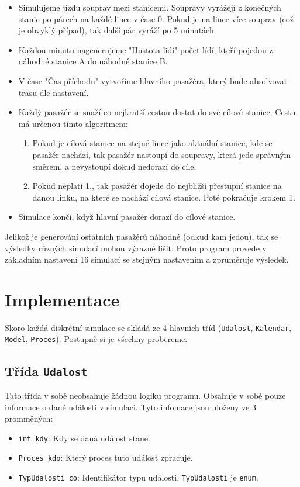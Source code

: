 \documentclass[12pt, a4paper]{article}
\begin{document}
\begin{itemize}
    \item Simulujeme jízdu souprav mezi stanicemi. Soupravy vyrážejí z konečných stanic po párech na každé lince v čase 0. Pokud je na lince více souprav (což je obvyklý případ), tak další pár vyráží po 5 minutách.
    \item Každou minutu nagenerujeme "Hustota lidí" počet lídí, kteří pojedou z náhodné stanice A do náhodné stanice B.
    \item V čase "Čas příchodu" vytvoříme hlavního pasažéra, který bude absolvovat trasu dle nastavení.
    \item Každý pasažér se snaží co nejkratší cestou dostat do své cílové stanice. Cestu má určenou tímto algoritmem:
        \begin{enumerate}
            \item Pokud je cílová stanice na stejné lince jako aktuální stanice, kde se pasažér nachází, tak pasažér nastoupí do soupravy, která jede správným směrem, a nevystoupí dokud nedorazí do cíle.
            \item Pokud neplatí 1., tak pasažér dojede do nejbližší přestupní stanice na danou linku, na které se nachází cílová stanice. Poté pokračuje krokem 1.
        \end{enumerate} 
    \item Simulace končí, když hlavní pasažér dorazí do cílové stanice.
\end{itemize}

Jelikož je generování ostatních pasažérů náhodné (odkud kam jedou), tak se výsledky různých simulací mohou výrazně lišit. Proto program provede v základním nastavení 16 simulací se stejným nastavením a zprůměruje výsledek.

\section{Implementace}

Skoro každá diskrétní simulace se skládá ze 4 hlavních tříd (\texttt{Udalost}, \texttt{Kalendar}, \texttt{Model}, \texttt{Proces}). Postupně si je všechny probereme. 

\subsection{Třída \texttt{Udalost}}
Tato třída v sobě neobsahuje žádnou logiku programu. Obsahuje v sobě pouze informace o dané události v simulaci. Tyto infomace jsou uloženy ve 3 promměných:
\begin{itemize}
    \item \texttt{int kdy}: Kdy se daná událost stane.
    \item \texttt{Proces kdo}: Který proces tuto událost zpracuje.
    \item \texttt{TypUdalosti co}: Identifikátor typu události. \texttt{TypUdalosti} je \texttt{enum}.
\end{itemize}
\end{document}
